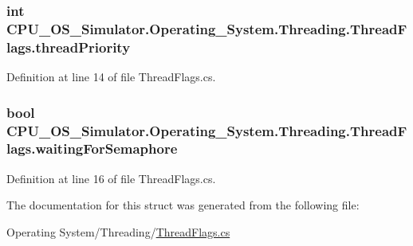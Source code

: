 \subsubsection[{thread\+Priority}]{\setlength{\rightskip}{0pt plus 5cm}int C\+P\+U\+\_\+\+O\+S\+\_\+\+Simulator.\+Operating\+\_\+\+System.\+Threading.\+Thread\+Flags.\+thread\+Priority}\label{struct_c_p_u___o_s___simulator_1_1_operating___system_1_1_threading_1_1_thread_flags_a1183510de09fd457d2ffd281e09bc9c4}


Definition at line 14 of file Thread\+Flags.\+cs.

\hypertarget{struct_c_p_u___o_s___simulator_1_1_operating___system_1_1_threading_1_1_thread_flags_ad519fd59ad20838f252f66885d7b9357}{}
\subsubsection[{waiting\+For\+Semaphore}]{\setlength{\rightskip}{0pt plus 5cm}bool C\+P\+U\+\_\+\+O\+S\+\_\+\+Simulator.\+Operating\+\_\+\+System.\+Threading.\+Thread\+Flags.\+waiting\+For\+Semaphore}\label{struct_c_p_u___o_s___simulator_1_1_operating___system_1_1_threading_1_1_thread_flags_ad519fd59ad20838f252f66885d7b9357}


Definition at line 16 of file Thread\+Flags.\+cs.



The documentation for this struct was generated from the following file\+:\begin{DoxyCompactItemize}
\item 
Operating System/\+Threading/\hyperlink{_thread_flags_8cs}{Thread\+Flags.\+cs}\end{DoxyCompactItemize}
